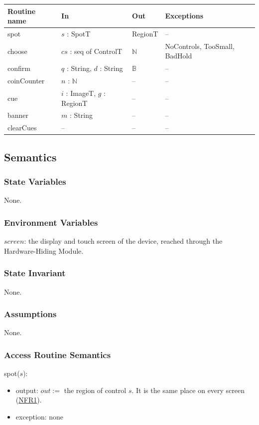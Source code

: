 \documentclass[10pt, titlepage]{article}
\newcommand{\srsurl}{https://team-hindsight.github.io/ophthamology-game/SRS/SRS.pdf}
\newcommand{\srsitemref}[2]{\href{\srsurl\#nameddest=#1}{#2}}
\newcommand{\B}{\mathbb{B}}
\newcommand{\N}{\mathbb{N}}
\newcommand{\T}[1]{\mathit{#1}}          %
\newcommand{\out}{\mathit{out}}
\newenvironment{accessprogs}{%
  \begin{center}\small
  \begin{tabular}{>{\raggedright\arraybackslash}p{3.0cm}
    >{\raggedright\arraybackslash}p{5.0cm}
    >{\raggedright\arraybackslash}p{2.8cm}
    >{\raggedright\arraybackslash}p{3.4cm}}
  \toprule
  \textbf{Routine name} & \textbf{In} & \textbf{Out} & \textbf{Exceptions}\\
  \midrule}{%
  \bottomrule
  \end{tabular}
  \end{center}}
\begin{document}
\begin{accessprogs}
spot & $s$ : SpotT & RegionT & --\\
choose & $\T{cs}$ : seq of ControlT & $\N$ & NoControls, TooSmall, BadHold\\
confirm & $q$ : String, $d$ : String & $\B$ & --\\
coinCounter & $n$ : $\N$ & -- & --\\
cue & $i$ : ImageT, $g$ : RegionT & -- & --\\
banner & $m$ : String & -- & --\\
clearCues & -- & -- & --\\
\end{accessprogs}

\subsection{Semantics}

\subsubsection{State Variables}

None.

\subsubsection{Environment Variables}

$\T{screen}$: the display and touch screen of the device, reached through the
Hardware-Hiding Module.

\subsubsection{State Invariant}

None.

\subsubsection{Assumptions}

None.

\subsubsection{Access Routine Semantics}

\noindent spot($s$):
\begin{itemize}
\item output: $\out :=$ the region of control $s$. It is the same place on
  every screen (\srsitemref{NFR_Layout}{NFR1}).
\item exception: none
\end{itemize}
\end{document}

